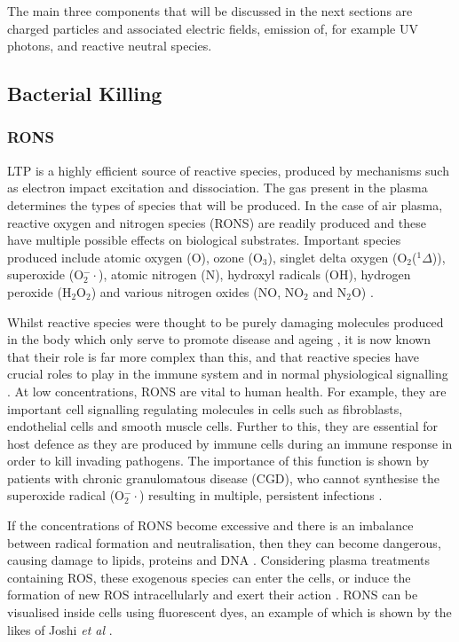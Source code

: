 \documentclass[11pt, oneside]{article}   	%
\begin{document}
The main three components that will be discussed in the next sections are charged particles and associated electric fields, emission of, for example UV photons, and reactive neutral species.


\subsection{Bacterial Killing}
\subsubsection{RONS}
LTP is a highly efficient source of reactive species, produced by mechanisms such as electron impact excitation and dissociation.
The gas present in the plasma determines the types of species that will be produced. 
In the case of air plasma, reactive oxygen and nitrogen species (RONS) are readily produced and these have multiple possible effects on biological substrates.
Important species produced include atomic oxygen (O), ozone (O$_3$), singlet delta oxygen (O$_2$($^1\Delta$)), superoxide (O$_2^-\cdot$), atomic nitrogen (N), hydroxyl radicals (OH), hydrogen peroxide (H$_2$O$_2$) and various nitrogen oxides (NO, NO$_2$ and N$_2$O) \cite{Graves2014low}.

Whilst reactive species were thought to be purely damaging molecules produced in the body which only serve to promote disease and ageing \cite{Harman1955aging}, it is now known that their role is far more complex than this, and that reactive species have crucial roles to play in the immune system and in normal physiological signalling \cite{Thannickal2000reactive}.
At low concentrations, RONS are vital to human health. 
For example, they are important cell signalling regulating molecules in cells such as fibroblasts, endothelial cells and smooth muscle cells.
Further to this, they are essential for host defence as they are produced by immune cells during an immune response in order to kill invading pathogens.
The importance of this function is shown by patients with chronic granulomatous disease (CGD), who cannot synthesise the superoxide radical (O$_2^-\cdot$) resulting in multiple, persistent infections \cite{PhamHuy2008free, Fang2004antimicrobial}.


If the concentrations of RONS become excessive and there is an imbalance between radical formation and neutralisation, then they can become dangerous, causing damage to lipids, proteins and DNA \cite{PhamHuy2008free}.
Considering plasma treatments containing ROS, these exogenous species can enter the cells, or induce the formation of new ROS intracellularly and exert their action \cite{Haertel2014nonthermal}.
RONS can be visualised inside cells using fluorescent dyes, an example of which is shown by the likes of Joshi \textit{et al} \cite{Joshi2010control}.
\end{document}
